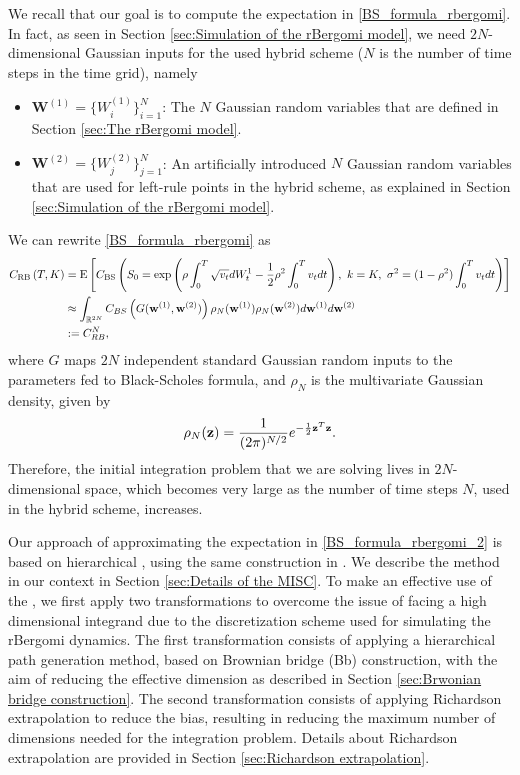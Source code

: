 We recall that our goal is to compute the expectation in \eqref{BS_formula_rbergomi}. In fact, as seen in Section \ref{sec:Simulation of the rBergomi model}, we need   $2N$-dimensional Gaussian inputs for the used  hybrid  scheme ($N$ is the number of time steps in  the time grid), namely
\begin{itemize}
	\item $\mathbf{W}^{(1)}=\{W^{(1)}_i\}_{i=1}^N$: The $N$ Gaussian random variables that are defined in Section  \ref{sec:The rBergomi model}.
	\item $\mathbf{W}^{(2)}=\{W^{(2)}_j\}_{j=1}^N$: An artificially introduced $N$ Gaussian random variables that are used for left-rule points in the hybrid scheme, as explained in Section  \ref{sec:Simulation of the rBergomi model}.
\end{itemize}
We can rewrite \eqref{BS_formula_rbergomi} as 
\begin{align}\label{BS_formula_rbergomi_2}
C_{\text{RB}}\left( T, K \right)&=\text{E}\left[C_{\text{BS}}\left( S_0 = \operatorname{exp}\left(\rho \int_0^T \sqrt{v_t} dW_t^1 - \frac{1}{2}
\rho^2 \int_0^T v_t dt\right),\ k = K, \ \sigma^2 = (1-\rho^2)
\int_0^T v_t dt \right) \right] \nonumber \\
&\approx \int_{\mathbb{R}^{2N}} C_{BS} \left(G(\mathbf{w}^{(1)},\mathbf{w}^{(2)})\right) \rho_{N}(\mathbf{w}^{(1)})  \rho_{N}(\mathbf{w}^{(2)}) d\mathbf{w}^{(1)} d\mathbf{w}^{(2)} \nonumber \\
&:=C_{RB}^{N},
\end{align}
where $G$  maps  $2N$ independent standard Gaussian random inputs to the parameters fed to Black-Scholes formula, and  $\rho_N$ is the multivariate Gaussian density, given by 
\begin{equation*}\label{eq: multivariate gaussian distribution}
\rho_N(\mathbf{z})=\frac{1}{(2 \pi)^{N/2}} e^{-\frac{1}{2} \mathbf{z}^T \mathbf{z}} .
\end{equation*} 
Therefore, the initial integration problem that we are solving lives in $2N$-dimensional space, which becomes very large as the number of time steps $N$, used in the hybrid scheme, increases.

Our approach of approximating the expectation in \eqref{BS_formula_rbergomi_2} is based on  hierarchical , using the same construction in \cite{haji2016multi}. We describe the    method in our context in Section \ref{sec:Details of the MISC}.  To make an effective use of the , we  first apply two transformations to overcome the issue of facing a high dimensional integrand due to the discretization scheme used for simulating the rBergomi dynamics. The first transformation consists of applying a hierarchical  path generation method, based on Brownian bridge (Bb) construction, with the aim of reducing the effective dimension as  described  in Section \ref{sec:Brwonian bridge construction}. The second transformation consists of applying Richardson extrapolation to reduce the bias, resulting in reducing  the maximum number of dimensions needed for the integration problem. Details about  Richardson extrapolation  are provided in Section \ref{sec:Richardson extrapolation}.

